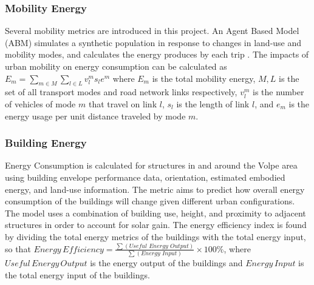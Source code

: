 {{        \subsubsection{Mobility Energy}
        {
            Several mobility metrics are introduced in this project. An Agent Based Model (ABM) simulates a synthetic population in response to changes in land-use and mobility modes, and calculates the energy produces by each trip \cite{grignard2017agent}. The impacts of urban mobility on energy consumption can be calculated as $E_m = \sum_{m \in M}\sum_{l \in L}v_l^m s_{l} e^m$ where $E_m$ is the total mobility energy, $M, L$ is the set of all transport modes and road network links respectively, $v_l^m$ is the number of vehicles of mode $m$ that travel on link $l$, $s_l$ is the length of link $l$, and $e_m$ is the energy usage per unit distance traveled by mode $m$.
        }

        \subsubsection{Building Energy}
        {
            Energy Consumption is calculated for structures in and around the Volpe area using building envelope performance data, orientation, estimated embodied energy, and land-use information. The metric aims to predict how overall energy consumption of the buildings will change given different urban configurations. The model uses a combination of building use, height, and proximity to adjacent structures in order to account for solar gain. The energy efficiency index is found by dividing the total energy metrics of the buildings with the total energy input, \cite{patterson1996energy} \cite{ferrao2013sustainable} so that $Energy\,Efficiency = \frac{\displaystyle\sum(Useful\,\,Energy\,\,Output)}{\displaystyle\sum(Energy\,\,Input)} \times 100\%$, where $Useful \,Energy \,Output$ is the energy output of the buildings and $Energy \,Input$ is the total energy input of the buildings.
        }

}}
